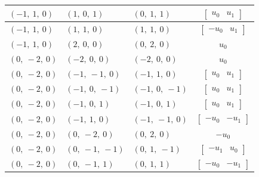 \documentclass[11pt]{article}
\theoremstyle{definition}
\begin{document}
\begin{longtable}{|l|l|l|c|}
    \hline
    $\left( -1, \  1, \  0\right)$ & $\left( 1, \  0, \  1\right)$ & $\left( 0, \  1, \  1\right)$ & $\left[\begin{matrix}u_{0} & u_{1}\end{matrix}\right]$ \\
    \hline
    $\left( -1, \  1, \  0\right)$ & $\left( 1, \  1, \  0\right)$ & $\left( 1, \  1, \  0\right)$ & $\left[\begin{matrix}- u_{0} & u_{1}\end{matrix}\right]$ \\
    \hline
    $\left( -1, \  1, \  0\right)$ & $\left( 2, \  0, \  0\right)$ & $\left( 0, \  2, \  0\right)$ & $u_{0}$ \\
    \hline
    $\left( 0, \  -2, \  0\right)$ & $\left( -2, \  0, \  0\right)$ & $\left( -2, \  0, \  0\right)$ & $u_{0}$ \\
    \hline
    $\left( 0, \  -2, \  0\right)$ & $\left( -1, \  -1, \  0\right)$ & $\left( -1, \  1, \  0\right)$ & $\left[\begin{matrix}u_{0} & u_{1}\end{matrix}\right]$ \\
    \hline
    $\left( 0, \  -2, \  0\right)$ & $\left( -1, \  0, \  -1\right)$ & $\left( -1, \  0, \  -1\right)$ & $\left[\begin{matrix}u_{0} & u_{1}\end{matrix}\right]$ \\
    \hline
    $\left( 0, \  -2, \  0\right)$ & $\left( -1, \  0, \  1\right)$ & $\left( -1, \  0, \  1\right)$ & $\left[\begin{matrix}u_{0} & u_{1}\end{matrix}\right]$ \\
    \hline
    $\left( 0, \  -2, \  0\right)$ & $\left( -1, \  1, \  0\right)$ & $\left( -1, \  -1, \  0\right)$ & $\left[\begin{matrix}- u_{0} & - u_{1}\end{matrix}\right]$ \\
    \hline
    $\left( 0, \  -2, \  0\right)$ & $\left( 0, \  -2, \  0\right)$ & $\left( 0, \  2, \  0\right)$ & $- u_{0}$ \\
    \hline
    $\left( 0, \  -2, \  0\right)$ & $\left( 0, \  -1, \  -1\right)$ & $\left( 0, \  1, \  -1\right)$ & $\left[\begin{matrix}- u_{1} & u_{0}\end{matrix}\right]$ \\
    \hline
    $\left( 0, \  -2, \  0\right)$ & $\left( 0, \  -1, \  1\right)$ & $\left( 0, \  1, \  1\right)$ & $\left[\begin{matrix}- u_{0} & - u_{1}\end{matrix}\right]$ \\

\end{longtable}
\end{document}
